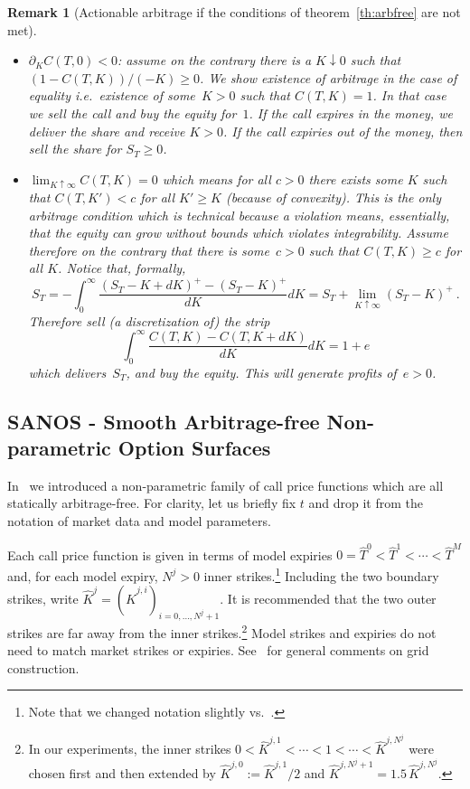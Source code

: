 \documentclass[11pt,a4paper]{article}
\newtheorem{remark}[definition]{Remark}
\begin{document}
\begin{remark}[Actionable arbitrage if the conditions of theorem~\ref{th:arbfree} are not met]
\begin{itemize}
    \item $\partial_K C(T,0)<0$: assume on the contrary there is a $K\downarrow 0$
    such that $(1-C(T,K))/(-K) \geq 0$. We show existence of
    arbitrage in the case of equality
    i.e.~existence of some~$K>0$ such that $C(T,K)=1$.
    In that case we sell the call and buy the equity for~$1$.
    If the call expires in the money, we deliver the share
    and receive $K>0$. If the call expiries out of the money, then sell
    the share for $S_T\geq 0$.

    \item $\lim_{K\uparrow \infty} C(T,K) = 0$ which means for all $c>0$
    there exists some $K$ such that $C(T,K')<c$ for all $K'\geq K$ (because of convexity).
    This is the only arbitrage condition which is technical because a violation means, 
    essentially, that the equity can grow without bounds which violates
    integrability.
    Assume therefore on the contrary 
    that there is some~$c>0$ such that $C(T,K)\geq c$ for all $K$. 
    Notice that, formally,
    $$
        S_T = - \int_0^\infty \frac{ (S_T-K+dK)^+ - (S_T-K)^+ }{ dK } dK
            = S_T + \lim_{K\uparrow \infty} (S_T-K)^+ \ .
    $$
    Therefore sell (a discretization of) the strip
    $$
    \int_0^\infty \frac{ C(T,K) -  C(T,K+dK) }{ dK } dK = 1 + e
    $$
    which delivers~$S_T$, and buy the equity. This will generate profits of~$e>0$.
 \end{itemize}
\end{remark}

\subsection{SANOS - Smooth Arbitrage-free Non-parametric Option Surfaces}
\label{sec:sanos}

In~\cite{SANOS2026} we introduced a  non-parametric family
of call price functions which are all statically arbitrage-free. For clarity, let us briefly fix $t$ and drop it from the notation of market data
and model parameters.

Each call price function is given in terms of model expiries
$0 = \hat T^0 < \hat T^1 < \cdots < \hat T^M$ and, for each model expiry,
$N^j>0$ inner strikes.\footnote{Note that we changed notation slightly vs.~\cite{SANOS2026}.}  Including the two boundary strikes, write
$\hat K^j = (\hat K^{j,i})_{i=0,\ldots,N^j+1}$. It is recommended that the two outer strikes
are far away from the inner strikes.\footnote{
    In our experiments, the inner strikes
    $0<\hat K^{j,1}<\cdots<1<\cdots<\hat K^{j,N^j}$
    were chosen first and then extended by $\hat K^{j,0}:=\hat K^{j,1}/2$ and
    $\hat K^{j,N^j+1} = 1.5\,\hat K^{j,N^j}$.
}  Model strikes and expiries do not need to match
market strikes or expiries. See~\cite{SANOS2026} for general comments on grid construction.
\end{document}
